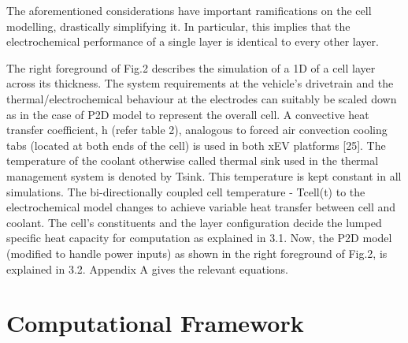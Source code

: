 The  aforementioned  considerations have  important  ramifications  on the  cell
modelling,  drastically simplifying  it. In  particular, this  implies that  the
electrochemical performance of a single layer is identical to every other layer.

The  right  foreground
of  Fig.2  describes  the  simulation  of  a 1D  of  a  cell  layer  across  its
thickness.  The  system  requirements  at the  vehicle’s  drivetrain  and  the
thermal/electrochemical behaviour at the electrodes  can suitably be scaled down
as in  the case of P2D  model to represent  the overall cell. A  convective heat
transfer  coefficient, h  (refer table  2), analogous  to forced  air convection
cooling tabs (located  at both ends of  the cell) is used in  both xEV platforms
[25]. The temperature  of the coolant otherwise called thermal  sink used in the
thermal management system is denoted by Tsink. This temperature is kept constant
in all simulations. The bi-directionally  coupled cell temperature - Tcell(t) to
the electrochemical model changes to achieve variable heat transfer between cell
and coolant.  The cell’s constituents  and the layer configuration  decide the
lumped specific heat capacity for computation  as explained in 3.1. Now, the P2D
model (modified  to handle  power inputs)  as shown in  the right  foreground of
Fig.2, is explained in 3.2. Appendix A gives the relevant equations.

\section{Computational Framework}\label{sec:layeroptframework}

